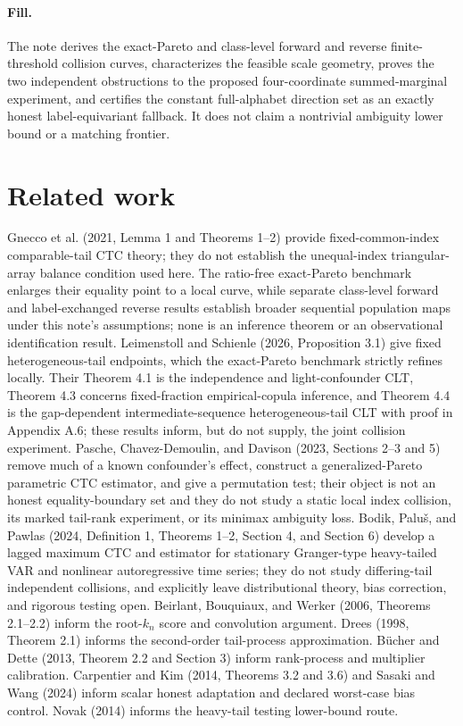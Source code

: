 \documentclass{article}
\begin{document}
\paragraph{Fill.} The note derives the exact-Pareto and class-level forward and reverse finite-threshold collision curves, characterizes the feasible scale geometry, proves the two independent obstructions to the proposed four-coordinate summed-marginal experiment, and certifies the constant full-alphabet direction set as an exactly honest label-equivariant fallback.  It does not claim a nontrivial ambiguity lower bound or a matching frontier.

\section{Related work}

Gnecco et al. (2021, Lemma 1 and Theorems 1--2) provide fixed-common-index comparable-tail CTC theory; they do not establish the unequal-index triangular-array balance condition used here. The ratio-free exact-Pareto benchmark enlarges their equality point to a local curve, while separate class-level forward and label-exchanged reverse results establish broader sequential population maps under this note's assumptions; none is an inference theorem or an observational identification result. Leimenstoll and Schienle (2026, Proposition 3.1) give fixed heterogeneous-tail endpoints, which the exact-Pareto benchmark strictly refines locally. Their Theorem 4.1 is the independence and light-confounder CLT, Theorem 4.3 concerns fixed-fraction empirical-copula inference, and Theorem 4.4 is the gap-dependent intermediate-sequence heterogeneous-tail CLT with proof in Appendix A.6; these results inform, but do not supply, the joint collision experiment. Pasche, Chavez-Demoulin, and Davison (2023, Sections 2--3 and 5) remove much of a known confounder's effect, construct a generalized-Pareto parametric CTC estimator, and give a permutation test; their object is not an honest equality-boundary set and they do not study a static local index collision, its marked tail-rank experiment, or its minimax ambiguity loss. Bodik, Paluš, and Pawlas (2024, Definition 1, Theorems 1--2, Section 4, and Section 6) develop a lagged maximum CTC and estimator for stationary Granger-type heavy-tailed VAR and nonlinear autoregressive time series; they do not study differing-tail independent collisions, and explicitly leave distributional theory, bias correction, and rigorous testing open. Beirlant, Bouquiaux, and Werker (2006, Theorems 2.1--2.2) inform the root-\(k_n\) score and convolution argument. Drees (1998, Theorem 2.1) informs the second-order tail-process approximation. Bücher and Dette (2013, Theorem 2.2 and Section 3) inform rank-process and multiplier calibration. Carpentier and Kim (2014, Theorems 3.2 and 3.6) and Sasaki and Wang (2024) inform scalar honest adaptation and declared worst-case bias control. Novak (2014) informs the heavy-tail testing lower-bound route.
\end{document}
